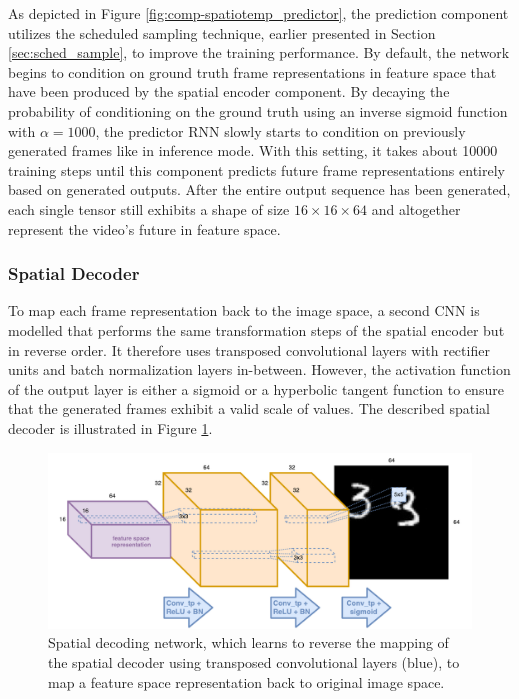 As depicted in Figure \ref{fig:comp-spatiotemp_predictor}, the prediction component utilizes the scheduled sampling technique, earlier presented in Section \ref{sec:sched_sample}, to improve the training performance. By default, the network begins to condition on ground truth frame representations in feature space that have been produced by the spatial encoder component. By decaying the probability of conditioning on the ground truth using an inverse sigmoid function with $\alpha = 1000$, the predictor RNN slowly starts to condition on previously generated frames like in inference mode. With this setting, it takes about \num{10000} training steps until this component predicts future frame representations entirely based on generated outputs. After the entire output sequence has been generated, each single tensor still exhibits a shape of size $16\times16\times64$ and altogether represent the video's future in feature space.

\subsubsection{Spatial Decoder}

To map each frame representation back to the image space, a second CNN is modelled that performs the same transformation steps of the spatial encoder but in reverse order. It therefore uses transposed convolutional layers with rectifier units and batch normalization layers in-between. However, the activation function of the output layer is either a sigmoid or a hyperbolic tangent function to ensure that the generated frames exhibit a valid scale of values. The described spatial decoder is illustrated in Figure \ref{fig:comp-spatial_decoder}.

\begin{figure}[htb]
	\centering
	\includegraphics[width=0.9\linewidth]{figures/comp_spatial_decoder.pdf} 
	\caption[Spatial Decoder Component]{Spatial decoding network, which learns to reverse the mapping of the spatial decoder using transposed convolutional layers (blue), to map a feature space representation back to original image space.} \label{fig:comp-spatial_decoder}
\end{figure}


